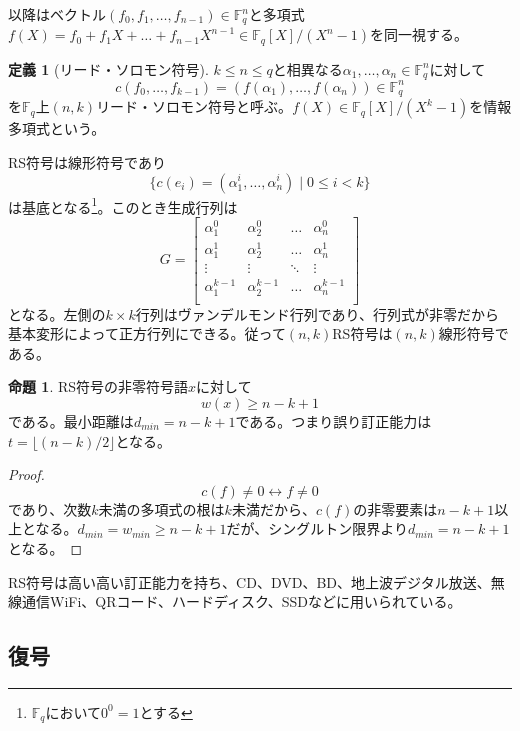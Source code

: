 \documentclass{jsarticle}
\newcommand{\F}{\mathbb{F}}
\renewcommand{\(}{\left(}
\renewcommand{\)}{\right)}
\newcommand{\floor}[1]{\lfloor #1 \rfloor}
\theoremstyle{definition}
\newtheorem{dfn}{定義}
\newtheorem{prop}{命題}
\begin{document}
以降はベクトル$(f_0, f_1, \dots, f_{n-1}) \in \F_q^n$と多項式$f(X) = f_0 + f_1X + \dots + f_{n-1}X^{n-1} \in \F_q[X] / (X^n - 1)$を同一視する。

\begin{dfn}[リード・ソロモン符号]
    $k \leq n \leq q$と相異なる$\alpha_1, \dots, \alpha_n \in \F_q^n$に対して
        \[c(f_0, \dots, f_{k-1}) = (f(\alpha_1), \dots, f(\alpha_n)) \in \F_q^n\]
    を$\F_q$上$(n, k)$リード・ソロモン符号と呼ぶ。$f(X) \in \F_q[X] / (X^k - 1)$を情報多項式という。
\end{dfn}

RS符号は線形符号であり
    \[\{c(e_i) = (\alpha_1^i, \dots, \alpha_n^i) \mid 0 \leq i < k\}\]
は基底となる\footnote{$\F_q$において$0^0 = 1$とする}。このとき生成行列は
    \[G = \begin{bmatrix}
        \alpha_1^0 & \alpha_2^0 & \dots & \alpha_n^0\\
        \alpha_1^1 & \alpha_2^1 & \dots & \alpha_n^1\\
        \vdots & \vdots & \ddots & \vdots\\
        \alpha_1^{k-1} & \alpha_2^{k-1} & \dots & \alpha_n^{k-1}\\
    \end{bmatrix}\]
となる。左側の$k \times k$行列はヴァンデルモンド行列であり、行列式が非零だから基本変形によって正方行列にできる。従って$(n, k)$RS符号は$(n, k)$線形符号である。

\begin{prop}
    RS符号の非零符号語$x$に対して
        \[w(x) \geq n - k + 1\]
    である。最小距離は$d_{min} = n - k + 1$である。つまり誤り訂正能力は$t = \floor{(n-k)/2}$となる。
\end{prop}
\begin{proof}
        \[c(f) \neq 0 \leftrightarrow f \neq 0\]
    であり、次数$k$未満の多項式の根は$k$未満だから、$c(f)$の非零要素は$n - k + 1$以上となる。$d_{min} = w_{min} \geq n - k + 1$だが、シングルトン限界より$d_{min} = n - k + 1$となる。
\end{proof}

RS符号は高い高い訂正能力を持ち、CD、DVD、BD、地上波デジタル放送、無線通信WiFi、QRコード、ハードディスク、SSDなどに用いられている。

\subsection{復号}
\end{document}
